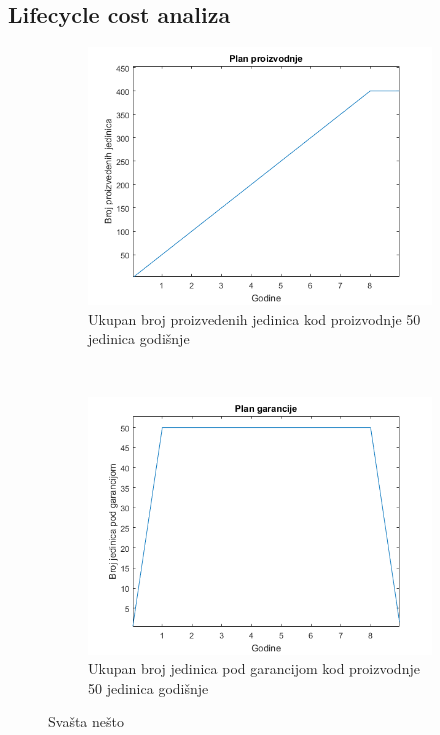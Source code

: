 \documentclass[12pt]{article}
\begin{document}
\subsection{Lifecycle cost analiza}


\begin{figure}[ht!]
    \centering
    \begin{subfigure}[t]{0.45\textwidth}
		\centering
		\includegraphics[scale = 0.5]{plan_proizvodnje/plan_proizvodnje-50}
		\caption{Ukupan broj proizvedenih jedinica kod proizvodnje 50 jedinica godišnje}
    \end{subfigure}%
    ~ 
    \begin{subfigure}[t]{0.45\textwidth}
		\centering
		\includegraphics[scale = 0.5]{plan_proizvodnje/plan_garancije-50}
		\caption{Ukupan broj jedinica pod garancijom kod proizvodnje 50 jedinica godišnje}
    \end{subfigure}
    \caption{Svašta nešto}
\end{figure}
\end{document}
